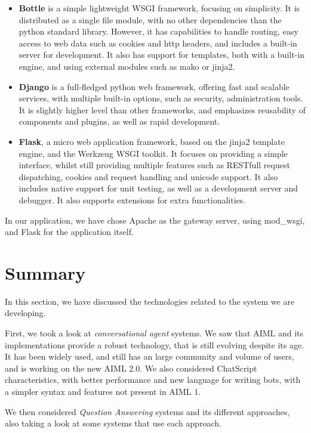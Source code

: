 \begin{itemize}
 \item \textbf{Bottle} is a simple lightweight WSGI framework, focusing on simplicity. It is distributed as a single file module, with no other dependencies than the python standard library. However, it has capabilities to handle routing, easy access to web data such as cookies and http headers, and includes a built-in server for development. It also has support for templates, both with a built-in engine, and using external modules such as mako or jinja2.
 \item \textbf{Django} is a full-fledged python web framework, offering fast and scalable services, with multiple built-in options, such as security, administration tools. It is slightly higher level than other frameworks, and emphasizes reusability of components and plugins, as well as rapid development. %
 \item \textbf{Flask}, a micro web application framework, based on the jinja2 template engine, and the Werkzeug WSGI toolkit. It focuses on providing a simple interface, whilst still providing multiple features such as RESTfull request dispatching, cookies and request handling and unicode support. It also includes native support for unit testing, as well as a development server and debugger. It also supports extensions for extra functionalities.
\end{itemize}

In our application, we have chose Apache as the gateway server, using mod\_wsgi, and Flask for the application itself. 

\section{Summary}

In this section, we have discussed the technologies related to the system we are developing.

First, we took a look at \emph{conversational agent} systems. We saw that AIML and its implementations provide a robust technology, that is still evolving despite its age. It has been widely used, and still has an large community and volume of users, and is working on the new AIML 2.0. We also considered ChatScript characteristics, with better performance and new language for writing bots, with a simpler syntax and features not present in AIML 1.

We then considered \emph{Question Answering} systems and its different approaches, also taking a look at some systems that use each approach.

